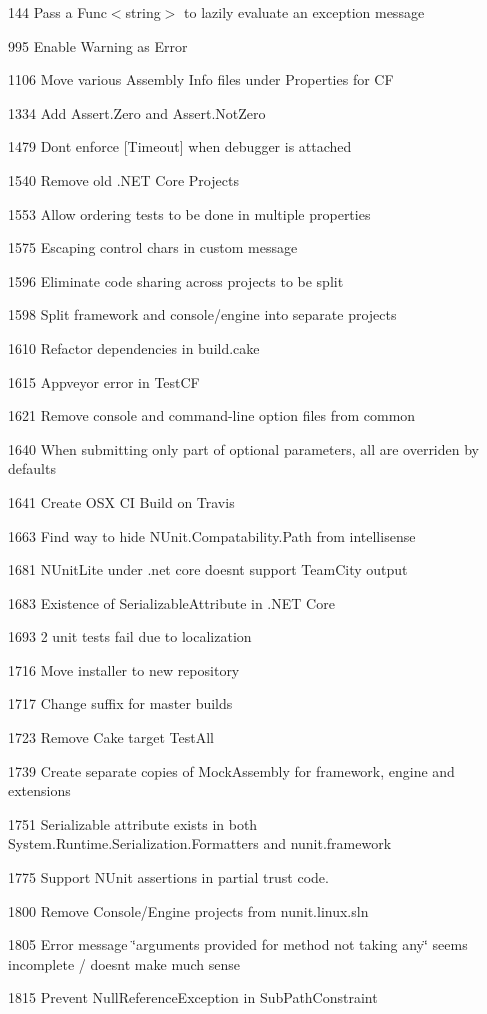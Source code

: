 \begin{DoxyItemize}
\item 144 Pass a {\ttfamily Func$<$string$>$} to lazily evaluate an exception message
\item 995 Enable Warning as Error
\item 1106 Move various Assembly Info files under Properties for CF
\item 1334 Add Assert.\+Zero and Assert.\+Not\+Zero
\item 1479 Don\textquotesingle{}t enforce [Timeout] when debugger is attached
\item 1540 Remove old .N\+ET Core Projects
\item 1553 Allow ordering tests to be done in multiple properties
\item 1575 Escaping control chars in custom message
\item 1596 Eliminate code sharing across projects to be split
\item 1598 Split framework and console/engine into separate projects
\item 1610 Refactor dependencies in build.\+cake
\item 1615 Appveyor error in Test\+CF
\item 1621 Remove console and command-\/line option files from common
\item 1640 When submitting only part of optional parameters, all are overriden by defaults
\item 1641 Create O\+SX CI Build on Travis
\item 1663 Find way to hide N\+Unit.\+Compatability.\+Path from intellisense
\item 1681 N\+Unit\+Lite under .net core doesn\textquotesingle{}t support Team\+City output
\item 1683 Existence of Serializable\+Attribute in .N\+ET Core
\item 1693 2 unit tests fail due to localization
\item 1716 Move installer to new repository
\item 1717 Change suffix for master builds
\item 1723 Remove Cake target Test\+All
\item 1739 Create separate copies of Mock\+Assembly for framework, engine and extensions
\item 1751 Serializable attribute exists in both System.\+Runtime.\+Serialization.\+Formatters and nunit.\+framework
\item 1775 Support N\+Unit assertions in partial trust code.
\item 1800 Remove Console/\+Engine projects from nunit.\+linux.\+sln
\item 1805 Error message \char`\"{}arguments provided for method not taking any\char`\"{} seems incomplete / doesn\textquotesingle{}t make much sense
\item 1815 Prevent Null\+Reference\+Exception in Sub\+Path\+Constraint
\end{DoxyItemize}

